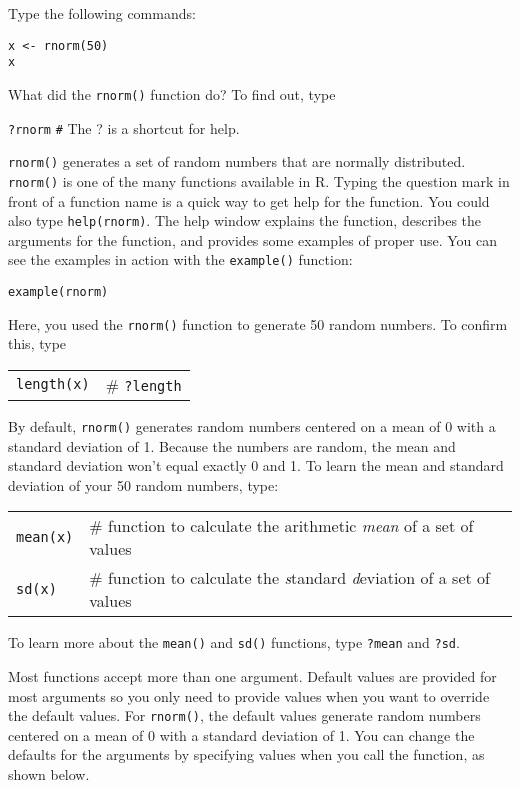 \documentclass[11pt]{article}
\begin{document}
Type the following commands:

\texttt{x \textless{}- rnorm(50)} \\
\texttt{x}

What did the \texttt{rnorm()} function do? To find out, type

\texttt{?rnorm}   \quad \texttt{\#} The ? is a shortcut for help.

\texttt{rnorm()} generates a set of random numbers that are normally distributed.
\texttt{rnorm()} is one of the many functions available in R. Typing the question
mark in front of a function name is a quick way to get help for the
function. You could also type \texttt{help(rnorm)}. The help window explains the
function, describes the arguments for the function, and provides some
examples of proper use. You can see the examples in action with the
\texttt{example()} function:

\texttt{example(rnorm)}

Here, you used the \texttt{rnorm()} function to generate 50 random numbers. To
confirm this, type

\begin{tabular}{@{}L{1in}L{4.5in}@{}}
\texttt{length(x)} 	&	\# \texttt{?length} \\
\end{tabular}

By default, \texttt{rnorm()} generates random numbers centered on a mean of 0 with
a standard deviation of 1. Because the numbers are random, the mean and
standard deviation won't equal exactly 0 and 1. To learn the mean and
standard deviation of your 50 random numbers, type:

\begin{tabular}{@{}L{1in}L{4.5in}@{}}
\texttt{mean(x)} 	&	 \# function to calculate the arithmetic \emph{mean} of a set of
values \\

\texttt{sd(x)} &	\# function to calculate the \emph{s}tandard \emph{d}eviation of a
set of values\\
\end{tabular}

To learn more about the \texttt{mean()} and \texttt{sd()} functions, type \texttt{?mean} and \texttt{?sd}.

Most functions accept more than one argument. Default values are
provided for most arguments so you only need to provide values when you
want to override the default values. For \texttt{rnorm()}, the default values
generate random numbers centered on a mean of 0 with a standard
deviation of 1. You can change the defaults for the arguments by
specifying values when you call the function, as shown below.
\end{document}
